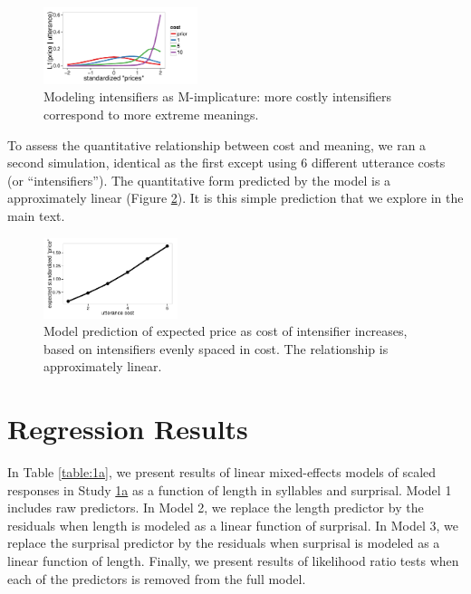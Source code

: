 \begin{appendices}
\begin{figure}[htb]
\begin{center}
\includegraphics[width=0.4\textwidth]{model_results.pdf}
\end{center}
\caption{Modeling intensifiers as M-implicature: more costly intensifiers correspond to more extreme meanings.} 
\label{model}
\end{figure}

To assess the quantitative relationship between cost and meaning, we ran a second simulation, identical as the first except using 6 different utterance costs (or ``intensifiers'').
The quantitative form predicted by the model is a approximately linear (Figure \ref{model-heights}).
It is this simple prediction that we explore in the main text.


\begin{figure}[htb]
\begin{center}\includegraphics[width=0.35\textwidth]{height-by-cost.pdf}
\end{center}
\caption{Model prediction of expected price as cost of intensifier increases, based on intensifiers evenly spaced in cost. The relationship is approximately linear.} 
\label{model-heights}
\end{figure}

\section{Regression Results \label{app:1a} \label{app:1b} \label{app:2} \label{app:3} \label{app:4}}


In Table \ref{table:1a}, we present results of linear mixed-effects models of scaled responses in Study \hyperref[sec:study1a]{1a} as a function of length in syllables and surprisal.
Model 1 includes raw predictors.
In Model 2, we replace the length predictor by the residuals when length is modeled as a linear function of surprisal.
In Model 3, we replace the surprisal predictor by the residuals when surprisal is modeled as a linear function of length.
Finally, we present results of likelihood ratio tests when each of the predictors is removed from the full model.


\end{appendices}
